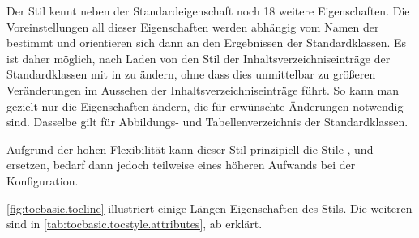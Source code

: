 \begin{description}
  Der Stil kennt neben der Standardeigenschaft  noch
  18
  weitere Eigenschaften. Die Voreinstellungen all dieser Eigenschaften werden
  abhängig vom Namen der  bestimmt und orientieren sich
  dann an den Ergebnissen der Standardklassen. Es ist daher möglich, nach
  Laden von  den Stil der Inhaltsverzeichniseinträge der
  Standardklassen mit  in
   zu ändern, ohne dass dies unmittelbar zu größeren
  Veränderungen im Aussehen der Inhaltsverzeichniseinträge führt. So kann man
  gezielt nur die Eigenschaften ändern, die für erwünschte Änderungen
  notwendig sind.  Dasselbe gilt für Abbildungs- und Tabellenverzeichnis der
  Standardklassen.%

  Aufgrund der hohen Flexibilität kann dieser Stil prinzipiell die Stile
  ,  und 
  ersetzen, bedarf dann jedoch teilweise eines höheren Aufwands bei der
  Konfiguration. 

  \autoref{fig:tocbasic.tocline} illustriert einige Längen-Eigenschaften des
  Stils. Die weiteren sind in \autoref{tab:tocbasic.tocstyle.attributes}, ab
   erklärt.
  \begin{figure}
    \centering
\end{figure}
\end{description}
